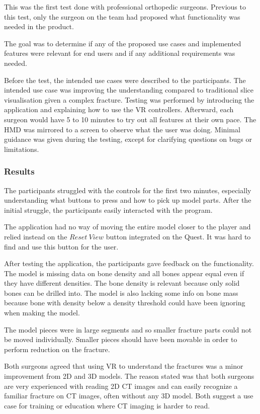 \documentclass[a4paper]{report}
\begin{document}
This was the first test done with professional orthopedic surgeons. Previous to this test, only the surgeon on the team had proposed what functionality was needed in the product.

The goal was to determine if any of the proposed use cases and implemented features were relevant for end users and if any additional requirements was needed.

Before the test, the intended use cases were described to the participants. The intended use case was improving the understanding compared to traditional slice visualisation given a complex fracture.
Testing was performed by introducing the application and explaining how to use the VR controllers. Afterward, each surgeon would have 5 to 10 minutes to try out all features at their own pace. The HMD was mirrored to a screen to observe what the user was doing. Minimal guidance was given during the testing, except for clarifying questions on bugs or limitations.

\subsubsection{Results}
The participants struggled with the controls for the first two minutes, especially understanding what buttons to press and how to pick up model parts. After the initial struggle, the participants easily interacted with the program.

The application had no way of moving the entire model closer to the player and relied instead on the $Reset\ View$ button integrated on the Quest. It was hard to find and use this button for the user.

After testing the application, the participants gave feedback on the functionality.
The model is missing data on bone density and all bones appear equal even if they have different densities. The bone density is relevant because only solid bones can be drilled into. The model is also lacking some info on bone mass because bone with density below a density threshold could have been ignoring when making the model.

The model pieces were in large segments and so smaller fracture parts could not be moved individually. Smaller pieces should have been movable in order to perform reduction on the fracture.

Both surgeons agreed that using VR to understand the fractures was a minor improvement from 2D and 3D models.
The reason stated was that both surgeons are very experienced with reading 2D CT images and can easily recognize a familiar fracture on CT images, often without any 3D model. Both suggest a use case for training or education where CT imaging is harder to read.
\end{document}
